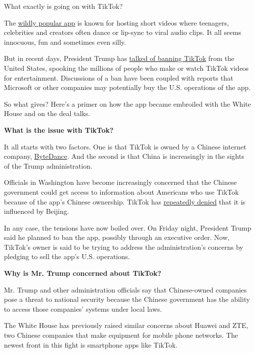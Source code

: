 What exactly is going on with TikTok?

The
\href{https://www.nytimes3xbfgragh.onion/2020/06/03/technology/tiktok-is-the-future.html}{wildly
popular app} is known for hosting short videos where teenagers,
celebrities and creators often dance or lip-sync to viral audio clips.
It all seems innocuous, fun and sometimes even silly.

But in recent days, President Trump has
\href{https://www.nytimes3xbfgragh.onion/2020/07/31/technology/tiktok-microsoft.html}{talked
of banning TikTok} from the United States, spooking the millions of
people who make or watch TikTok videos for entertainment. Discussions of
a ban have been coupled with reports that Microsoft or other companies
may potentially buy the U.S. operations of the app.

So what gives? Here's a primer on how the app became embroiled with the
White House and on the deal talks.

\textbf{What is the issue with TikTok?}

It all starts with two factors. One is that TikTok is owned by a Chinese
internet company,
\href{https://www.nytimes3xbfgragh.onion/2018/10/29/technology/bytedance-app-funding-china.html}{ByteDance}.
And the second is that China is increasingly in the sights of the Trump
administration.

Officials in Washington have become increasingly concerned that the
Chinese government could get access to information about Americans who
use TikTok because of the app's Chinese ownership. TikTok has
\href{https://www.nytimes3xbfgragh.onion/2019/11/18/technology/tiktok-alex-zhu-interview.html}{repeatedly
denied} that it is influenced by Beijing.

In any case, the tensions have now boiled over. On Friday night,
President Trump said he planned to ban the app, possibly through an
executive order. Now, TikTok's owner is said to be trying to address the
administration's concerns by pledging to sell the app's U.S. operations.

\textbf{Why is Mr. Trump concerned about TikTok?}

Mr. Trump and other administration officials say that Chinese-owned
companies pose a threat to national security because the Chinese
government has the ability to access those companies' systems under
local laws.

The White House has previously raised similar concerns about Huawei and
ZTE, two Chinese companies that make equipment for mobile phone
networks. The newest front in this fight is smartphone apps like TikTok.

